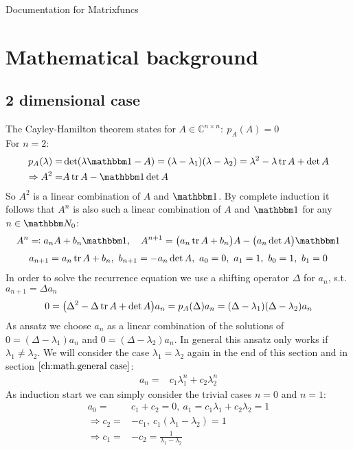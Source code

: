 \documentclass[12pt]{article}
\begin{document}
\centerline{\sc \large Documentation for Matrixfuncs}
\vspace{.5pc}
\vspace{2pc}

\tableofcontents

\section{Mathematical background}
\subsection{2 dimensional case}
The Cayley-Hamilton theorem states for $A\in \mathbb C^{n\times n}:\ p_A(A)=0$\\
For $n=2$:
\begin{align}
p_A(\lambda) =& \det(\lambda\mathbbm 1 - A) = (\lambda - \lambda_1)(\lambda - \lambda_2) = \lambda^2 -\lambda\tr A + \det A\\
\Rightarrow A^2 =& A \tr A - \mathbbm 1 \det A
\end{align}
So $A^2$ is a linear combination of $A$ and $\mathbbm 1$. By complete induction it follows that $A^n$ is also such a linear combination of $A$ and $\mathbbm 1$ for any $n \in \mathbbm N_0$:
\begin{align}
A^n \eqqcolon a_n A + b_n\mathbbm 1,\ \ \ A^{n+1} = \big(a_n\tr A + b_n\big)A - \big(a_n\det A \big)\mathbbm 1
\end{align}
\begin{align}
a_{n+1} = a_n\tr A + b_n,\ b_{n+1} = -a_n\det A,\ a_0=0,\ a_1=1,\ b_0=1,\ b_1=0 \label{recurrent 2dim}
\end{align}
In order to solve the recurrence equation we use a shifting operator $\Delta$ for $a_n$, s.t. $a_{n+1} = \Delta a_n$
\begin{align}
0 = \big(\Delta^2 - \Delta\tr A + \det A\big) a_n = p_A(\Delta) a_n = (\Delta-\lambda_1)(\Delta-\lambda_2) a_n
\end{align}
As ansatz we choose $a_n$ as a linear combination of the solutions of $0=(\Delta-\lambda_1)a_n$ and $0=(\Delta-\lambda_2)a_n$. In general this ansatz only works if $\lambda_1 \neq \lambda_2$. We will consider the case $\lambda_1 = \lambda_2$ again in the end of this section and in section $\ref{ch:math.general case}$:
\begin{align}
a_n =& c_1 \lambda_1^n + c_2\lambda_2^n
\end{align}
As induction start we can simply consider the trivial cases $n=0$ and $n=1$:
\begin{align}
a_0 =& c_1 + c_2 = 0,\ a_1 = c_1\lambda_1 + c_2\lambda_2 = 1 \nonumber\\
\Rightarrow c_2 =& -c_1,\ c_1(\lambda_1 - \lambda_2) = 1 \nonumber\\
\Rightarrow c_1 =& -c_2 = \frac 1 {\lambda_1 - \lambda_2}
\end{align}
\end{document}
